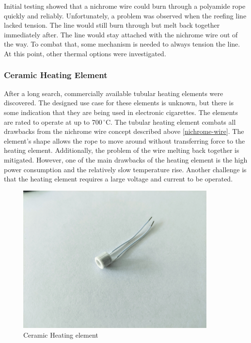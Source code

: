 Initial testing showed that a nichrome wire could burn through a polyamide rope quickly and reliably. Unfortunately, a problem was observed when the reefing line lacked tension. The line would still burn through but melt back together immediately after. The line would stay attached with the nichrome wire out of the way. To combat that, some mechanism is needed to always tension the line. At this point, other thermal options were investigated.

\newpage

\subsubsection{Ceramic Heating Element}
After a long search, commercially available tubular heating elements were discovered. The designed use case for these elements is unknown, but there is some indication that they are being used in electronic cigarettes. The elements are rated to operate at up to 700\,$^\circ$C. The tubular heating element combats all drawbacks from the nichrome wire concept described above \ref{nichrome-wire}. The element's shape allows the rope to move around without transferring force to the heating element.
Additionally, the problem of the wire melting back together is mitigated. However, one of the main drawbacks of the heating element is the high power consumption and the relatively slow temperature rise. Another challenge is that the heating element requires a large voltage and current to be operated.

\begin{figure}[h!]
	\centering
	\includegraphics[width=10cm]{images/element}
	\caption{Ceramic Heating element}
	\label{fig:element}
\end{figure}

\newpage

